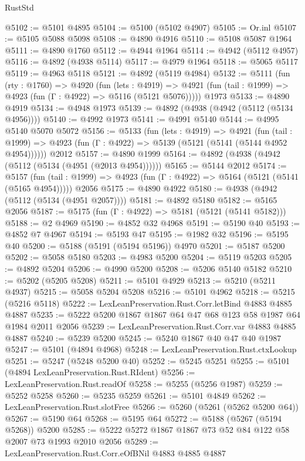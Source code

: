 \begin{lexlean}{RustStd}
\begin{coremodule}
@5102 := @5101 @4895
@5104 := @5100 (@5102 @4907)
@5105 := Or.inl
@5107 := @5105 @5088 @5098
@5108 := @4890 @4916
@5110 := @5108 @5087 @1964
@5111 := @4890 @1760
@5112 := @4944 @1964
@5114 := @4942 (@5112 @4957)
@5116 := @4892 (@4938 @5114)
@5117 := @4979 @1964
@5118 := @5065 @5117
@5119 := @4963 @5118
@5121 := @4892 (@5119 @4984)
@5132 := @5111
    (fun (rty : @1760) =>
    @4920
      (fun (lets : @4919) =>
      @4921 (fun (tail : @1999) => @4923 (fun (Γ : @4922) => @5116 (@5121 @5076)))))
    @1973
@5133 := @4890 @4919
@5134 := @4948 @1973
@5139 := @4892 (@4938 (@4942 (@5112 (@5134 @4956))))
@5140 := @4992 @1973
@5141 := @4991 @5140
@5144 := @4995 @5140 @5070 @5072
@5156 := @5133
    (fun (lets : @4919) =>
    @4921
      (fun (tail : @1999) => @4923 (fun (Γ : @4922) => @5139 (@5121 (@5141 (@5144 @4952 @4954))))))
    @2012
@5157 := @4890 @1999
@5164 := @4892 (@4938 (@4942 (@5112 (@5134 (@4951 (@2013 @4954))))))
@5165 := @5144 @2012
@5174 := @5157
    (fun (tail : @1999) => @4923 (fun (Γ : @4922) => @5164 (@5121 (@5141 (@5165 @4954)))))
    @2056
@5175 := @4890 @4922
@5180 := @4938 (@4942 (@5112 (@5134 (@4951 @2057))))
@5181 := @4892 @5180
@5182 := @5165 @2056
@5187 := @5175 (fun (Γ : @4922) => @5181 (@5121 (@5141 @5182)))
@5188 := @2 @4969
@5190 := @4852 @32 @4968
@5191 := @5190 @40
@5193 := @4852 @7 @4967
@5194 := @5193 @47
@5195 := @1982 @32
@5196 := @5195 @40
@5200 := @5188 (@5191 (@5194 @5196)) @4970
@5201 := @5187 @5200
@5202 := @5058 @5180
@5203 := @4983 @5200
@5204 := @5119 @5203
@5205 := @4892 @5204
@5206 := @4990 @5200
@5208 := @5206 @5140 @5182
@5210 := @5202 (@5205 @5208)
@5211 := @5101 @4929
@5213 := @5210 (@5211 @4937)
@5215 := @5058 @5204 @5208
@5216 := @5101 @4962
@5218 := @5215 (@5216 @5118)
@5222 := LexLeanPreservation.Rust.Corr.letBind @4883 @4885 @4887
@5235 := @5222 @5200 @1867 @1867 @64 @47 @68 @123 @58 @1987 @64 @1984 @2011 @2056
@5239 := LexLeanPreservation.Rust.Corr.var @4883 @4885 @4887
@5240 := @5239 @5200
@5245 := @5240 @1867 @40 @47 @40 @1987
@5247 := @5101 (@4894 @4968)
@5248 := LexLeanPreservation.Rust.ctxLookup
@5251 := @5247 (@5248 @5200 @40)
@5252 := @5245 @5251
@5255 := @5101 (@4894 LexLeanPreservation.Rust.RIdent)
@5256 := LexLeanPreservation.Rust.readOf
@5258 := @5255 (@5256 @1987)
@5259 := @5252 @5258
@5260 := @5235 @5259
@5261 := @5101 @4849
@5262 := LexLeanPreservation.Rust.slotFree
@5266 := @5260 (@5261 (@5262 @5200 @64))
@5267 := @5190 @64
@5268 := @5195 @64
@5272 := @5188 (@5267 (@5194 @5268)) @5200
@5285 := @5222 @5272 @1867 @1867 @73 @52 @84 @122 @58 @2007 @73 @1993 @2010 @2056
@5289 := LexLeanPreservation.Rust.Corr.eOfBNil @4883 @4885 @4887

\end{coremodule}
\end{lexlean}
